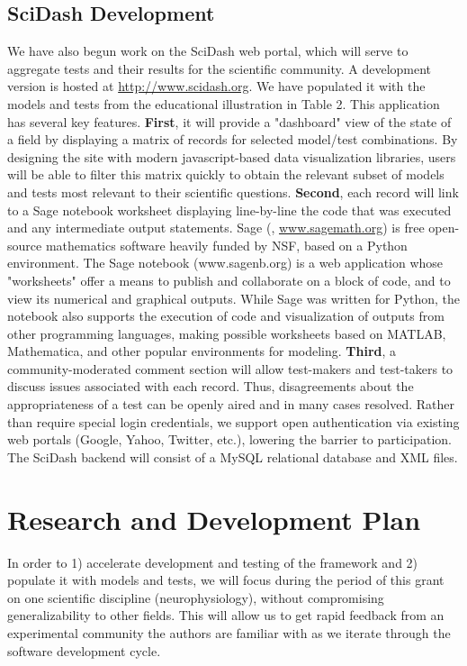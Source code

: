 \documentclass[a4paper,12pt]{article}
\begin{document}
\subsection{SciDash Development}
We have also begun work on the SciDash web portal, which will serve to aggregate tests and their results for the scientific community. A development version is hosted at \url{http://www.scidash.org}.  We have populated it with the models and tests from the educational illustration in Table 2.  This application has several key features.  \textbf{First}, it will provide a "dashboard" view of the state of a field by displaying a matrix of records for selected model/test combinations.  By designing the site with modern javascript-based data visualization libraries, users will be able to filter this matrix quickly to obtain the relevant subset of models and tests most relevant to their scientific questions.  \textbf{Second}, each record will link to a Sage notebook worksheet displaying line-by-line the code that was executed and any intermediate output statements.  Sage (\cite{stein2005}, \url{www.sagemath.org}) is free open-source mathematics software heavily funded by NSF, based on a Python environment.  The Sage notebook (www.sagenb.org) is a web application whose "worksheets" offer a means to publish and collaborate on a block of code, and to view its numerical and graphical outputs.  While Sage was written for Python, the notebook also supports the execution of code and visualization of outputs from other programming languages, making possible worksheets based on MATLAB, Mathematica, and other popular environments for modeling.  \textbf{Third}, a community-moderated comment section will allow test-makers and test-takers to discuss issues associated with each record.  Thus, disagreements about the appropriateness of a test can be openly aired and in many cases resolved.  Rather than require special login credentials, we support open authentication via existing web portals (Google, Yahoo, Twitter, etc.), lowering the barrier to participation.  The SciDash backend will consist of a MySQL relational database and XML files.  

\section{Research and Development Plan}
In order to 1) accelerate development and testing of the framework and 2) populate it with models and tests, we will focus during the period of this grant on one scientific discipline (neurophysiology), without compromising generalizability to other fields. This will allow us to get rapid feedback from an experimental community the authors are familiar with as we iterate through the software development cycle.  
\end{document}
